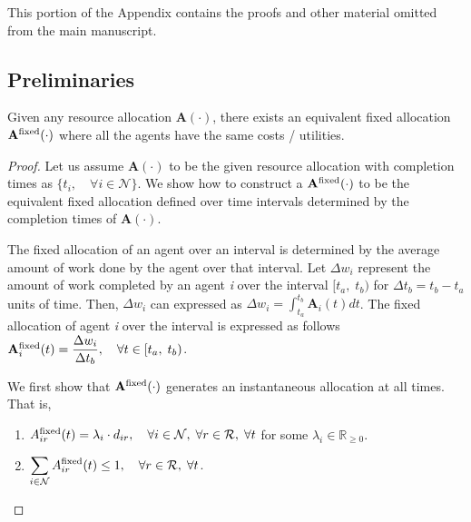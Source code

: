 \documentclass[letterpaper]{article} %
\theoremstyle{definition}
\newenvironment{customlemma}[1]
  {\renewcommand\theinnercustomlemma{#1}\innercustomlemma}
  {\endinnercustomlemma}
\begin{document}
This portion of the Appendix contains the proofs and other material omitted from the main manuscript.

\subsection{Preliminaries}

\begin{customlemma}{1}
Given any resource allocation $\mathbf{A}(\cdot)$, there exists an equivalent fixed allocation $\mathbf{A}^{\textnormal{fixed}}(\cdot)$ where all the agents have the same costs / utilities.
\end{customlemma}

\begin{proof}
Let us assume $\mathbf{A}(\cdot)$ to be the given resource allocation with completion times as $\{t_{i}, \quad \forall i \in \mathcal{N}\}$.
We show how to construct a $\mathbf{A}^{\textnormal{fixed}}(\cdot)$ to be the equivalent fixed allocation defined over time intervals determined by the completion times of $\mathbf{A}(\cdot)$.

The fixed allocation of an agent over an interval is determined by the average amount of work done by the agent over that interval. Let $\Delta w_{i}$ represent the amount of work completed by an agent \textit{i} over the interval $[t_{a}, \; t_{b})$ for $\Delta t_{b} = t_{b} - t_{a}$ units of time. Then, $\Delta w_{i}$ can expressed as $\Delta w_{i}  = \int_{t_{a}}^{t_{b}} \mathbf{A}_{i}(t) dt$. The fixed allocation of agent \textit{i} over the interval is expressed as follows \\$\mathbf{A}^{\textnormal{fixed}}_{i}(t) = \dfrac{\Delta w_{i}}{\Delta t_{b}}, \quad \forall t \in [t_{a}, \; t_{b})$.

We first show that $\mathbf{A}^{\textnormal{fixed}}(\cdot)$ generates an instantaneous allocation at all times. That is, 
\begin{enumerate}
    \item $A^{\textnormal{fixed}}_{ir}(t) = \lambda_{i} \cdot d_{ir}, \quad \forall i \in \mathcal{N}, \; \forall r \in \mathcal{R}, \; \forall t$ for some $\lambda_{i} \in \mathbb{R}_{\geq 0}$.
    
    \item $\displaystyle \sum_{i \in \mathcal{N}} A^{\textnormal{fixed}}_{ir}(t) \leq  1, \quad \forall r \in \mathcal{R}, \; \forall t$.
    
\end{enumerate}


\end{proof}
\end{document}
